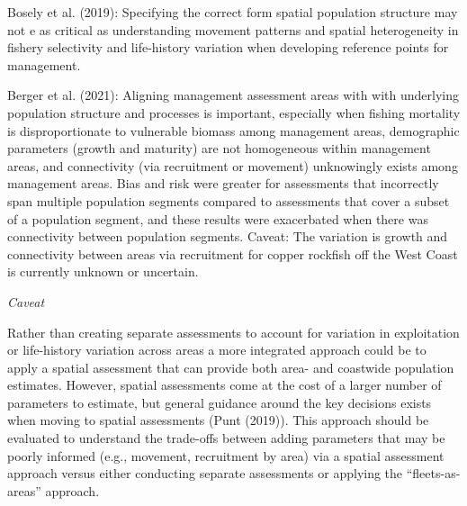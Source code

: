 \documentclass[11pt,
  english,
  a4paper,
]{article}
\begin{document}
\leavevmode\tagmcend\tagstructend\par


Bosely et al. {(2019)\leavevmode\tagmcend\tagstructend}: Specifying the correct form spatial population structure may not e as critical as understanding movement patterns and spatial heterogeneity in fishery selectivity and life-history variation when developing reference points for management.

\leavevmode\tagmcend\tagstructend\par


Berger et al. {(2021)\leavevmode\tagmcend\tagstructend}: Aligning management assessment areas with with underlying population structure and processes is important, especially when fishing mortality is disproportionate to vulnerable biomass among management areas, demographic parameters (growth and maturity) are not homogeneous within management areas, and connectivity (via recruitment or movement) unknowingly exists among management areas. Bias and risk were greater for assessments that incorrectly span multiple population segments compared to assessments that cover a subset of a population segment, and these results were exacerbated when there was connectivity between population segments. Caveat: The variation is growth and connectivity between areas via recruitment for copper rockfish off the West Coast is currently unknown or uncertain.

\leavevmode\tagmcend\tagstructend\par


\emph{Caveat}

\leavevmode\tagmcend\tagstructend\par


Rather than creating separate assessments to account for variation in exploitation or life-history variation across areas a more integrated approach could be to apply a spatial assessment that can provide both area- and coastwide population estimates. However, spatial assessments come at the cost of a larger number of parameters to estimate, but general guidance around the key decisions exists when moving to spatial assessments (Punt {(2019)\leavevmode\tagmcend\tagstructend}). This approach should be evaluated to understand the trade-offs between adding parameters that may be poorly informed (e.g., movement, recruitment by area) via a spatial assessment approach versus either conducting separate assessments or applying the ``fleets-as-areas'' approach.

\leavevmode\tagmcend\tagstructend\par

\clearpage
\end{document}
